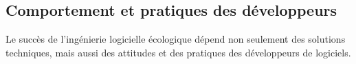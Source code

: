 
\subsection{Comportement et pratiques des développeurs}
Le succès de l'ingénierie logicielle écologique dépend non seulement des solutions techniques, mais aussi des attitudes et des pratiques des développeurs de logiciels.


